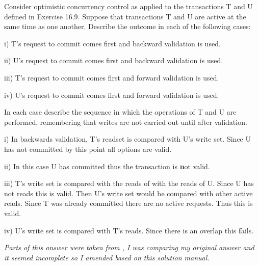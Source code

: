 \documentclass{article}
\begin{document}
\begin{tcolorbox}[colback=blue!5!white,colframe=blue!75!black,title=Problem 16.16]
Consider optimistic concurrency control as applied to the transactions T and U defined
in Exercise 16.9. Suppose that transactions T and U are active at the same time as one
another. Describe the outcome in each of the following cases:
\begin{enumerate}i) T’s request to commit comes first and backward validation is used.
\end{enumerate}
\begin{enumerate}ii) U’s request to commit comes first and backward validation is used.
\end{enumerate}
\begin{enumerate}iii) T’s request to commit comes first and forward validation is used.
\end{enumerate}
\begin{enumerate}iv) U’s request to commit comes first and forward validation is used.
\end{enumerate}

In each case describe the sequence in which the operations of T and U are performed,
remembering that writes are not carried out until after validation.
\end{tcolorbox}

\begin{tcolorbox}[colback=green!5!white,colframe=green!75!black,title=Answer 16.16]
    \begin{enumerate}i)
        In backwards validation, T's readset is compared with U's write set. Since U has not committed
        by this point all options are valid. 
    \end{enumerate}
    \begin{enumerate}ii)
        In this case U has committed thus the transaction is \textbf not valid.
    \end{enumerate}
    \begin{enumerate}iii)
        T's write set is compared with the reads of with the reads of U. Since U has not reads this is valid.
        Then U's write set would be compared with other active reads. Since T was already committed there are no 
        active requests. Thus this is valid.
    \end{enumerate}
    \begin{enumerate}iv)
        U's write set is compared with T's reads. Since there is an overlap this \textbf fails.
    \end{enumerate}
    
    \textit{Parts of this answer were taken from \citet{Kontogiannis}, I was comparing my original answer and it seemed incomplete so I amended based on this solution manual.}
\end{tcolorbox}
\end{document}
